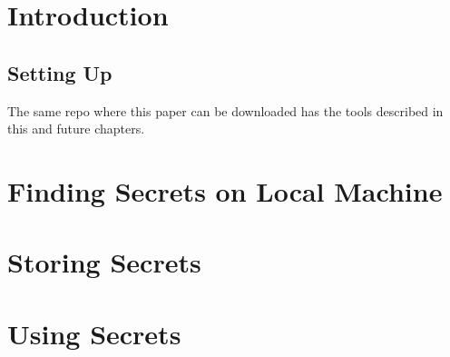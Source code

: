 \documentclass[11pt]{report}
\begin{document}
	\cleardoublepage
	
	
	\tableofcontents
	\thispagestyle{empty}
	\cleardoublepage
	\setcounter{page}{1}
	
	
	\chapter{Introduction}
	
	
	
	\section{Setting Up}
	
	The same repo where this paper can be downloaded has the tools described in this and future chapters.
	
	\chapter{Finding Secrets on Local Machine}
	
	\lipsum[1]
	
	\chapter{Storing Secrets}
	
	\lipsum[1]
	
	\chapter{Using Secrets}
	
	\lipsum[1]
	
\end{document}
